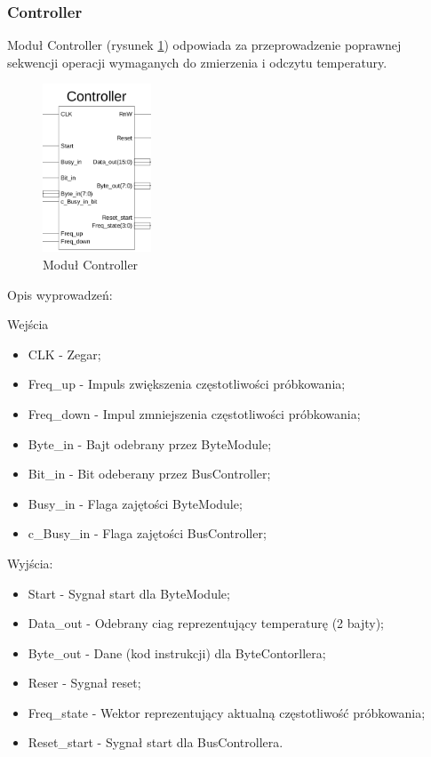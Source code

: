 \documentclass[a4paper]{article}
\begin{document}
\subsubsection{Controller}


Moduł Controller (rysunek \ref{controller_sym}) odpowiada za przeprowadzenie poprawnej sekwencji operacji wymaganych do zmierzenia i odczytu temperatury.

\begin{figure}[H]
\begin{center}
\includegraphics[height=5cm]{graphics/controller_sym.png}
\end{center}
\caption{Moduł Controller}
\label{controller_sym}
\end{figure}

Opis wyprowadzeń:

Wejścia
\begin{itemize}
\item CLK - Zegar;
\item Freq\_up - Impuls zwiększenia częstotliwości próbkowania;
\item Freq\_down - Impul zmniejszenia częstotliwości próbkowania;
\item Byte\_in - Bajt odebrany przez ByteModule;
\item Bit\_in - Bit odeberany przez BusController;
\item Busy\_in - Flaga zajętości ByteModule;
\item c\_Busy\_in - Flaga zajętości BusController;
\end{itemize}

Wyjścia:
\begin{itemize}
\item Start - Sygnał start dla ByteModule;
\item Data\_out - Odebrany ciag reprezentujący temperaturę (2 bajty);
\item Byte\_out - Dane (kod instrukcji) dla ByteContorllera;
\item Reser - Sygnał reset;
\item Freq\_state - Wektor reprezentujący aktualną częstotliwość próbkowania;
\item Reset\_start - Sygnał start dla BusControllera. 
\end{itemize}
\end{document}
